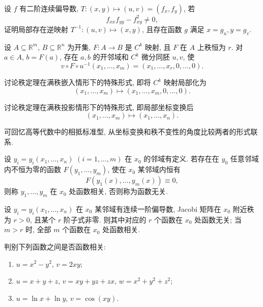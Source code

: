 \documentclass[../../数学分析培优讲义.tex]{subfiles}
\begin{document}
\begin{example}
设 $f$ 有二阶连续偏导数, $T:(x,y)\mapsto(u,v)=(f_x,f_y)$, 若
\[
    f_{xx}f_{yy}-f_{xy}^2\ne0,
\]
证明局部存在逆映射 $T^{-1}:(u,v)\mapsto(x,y)$, 且存在函数 $g$ 满足 $x=g_u,y=g_v$.
\end{example}
\exampleblank




\begin{theorem}
设 $A\subseteq\mathbb{R}^m$, $B\subseteq\mathbb{R}^n$ 为开集, $F:A\to B$ 是 $C^k$ 映射, 且 $F$ 在 $A$ 上秩恒为 $r$. 对 $a\in A$, $b=F(a)$, 存在 $a,b$ 的开邻域和 $C^k$ 微分同胚 $u,v$, 使
\[
    v\circ F\circ u^{-1}(x_1,\ldots,x_m)
    =(x_1,\ldots,x_r,0,\ldots,0).
\]
\end{theorem}

\begin{example}
讨论秩定理在满秩嵌入情形下的特殊形式, 即将 $C^k$ 映射局部化为
\[
    (x_1,\ldots,x_m)\mapsto(x_1,\ldots,x_m,0,\ldots,0).
\]
\end{example}
\exampleblank

\begin{example}
讨论秩定理在满秩投影情形下的特殊形式, 即局部坐标变换后
\[
    (x_1,\ldots,x_m)\mapsto(x_1,\ldots,x_n).
\]
\end{example}
\exampleblank

\begin{remark}
可回忆高等代数中的相抵标准型, 从坐标变换和秩不变性的角度比较两者的形式联系.
\end{remark}




\begin{definition}
设 $y_i=y_i(x_1,\ldots,x_n)$ $(i=1,\ldots,m)$ 在 $x_0$ 的邻域有定义. 若存在在 $y_0$ 任意邻域内不恒为零的函数 $F(y_1,\ldots,y_m)$, 使在 $x_0$ 某邻域内恒有
\[
    F(y_1(x),\ldots,y_m(x))\equiv0,
\]
则称 $y_1,\ldots,y_m$ 在 $x_0$ 处函数相关, 否则称为函数无关.
\end{definition}

\begin{theorem}[\markstar]
设 $y_i=y_i(x_1,\ldots,x_n)$ 在 $x_0$ 某邻域有连续一阶偏导数, Jacobi 矩阵在 $x_0$ 附近秩为 $r>0$, 且某个 $r$ 阶子式非零. 则其中对应的 $r$ 个函数在 $x_0$ 处函数无关; 当 $m>r$ 时, 全部 $m$ 个函数在 $x_0$ 处函数相关.
\end{theorem}

\begin{example}
判别下列函数之间是否函数相关:
\begin{enumerate}[label=(\arabic*)]
    \item $u=x^2-y^2$, $v=2xy$;
    \item $u=x+y+z$, $v=xy+yz+zx$, $w=x^2+y^2+z^2$;
    \item $u=\ln x+\ln y$, $v=\cos(xy)$.
\end{enumerate}
\end{example}
\exampleblank
\end{document}
